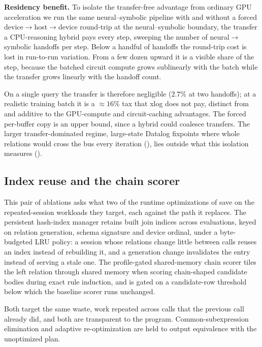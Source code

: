 \textbf{Residency benefit.} To isolate the transfer-free advantage from ordinary GPU acceleration we run the same neural--symbolic pipeline with and without a forced device$\to$host$\to$device round-trip at the neural--symbolic boundary, the transfer a CPU-reasoning hybrid pays every step, sweeping the number of neural$\to$symbolic handoffs per step. Below a handful of handoffs the round-trip cost is lost in run-to-run variation. From a few dozen upward it is a visible share of the step, because the batched circuit compute grows sublinearly with the batch while the transfer grows linearly with the handoff count.

On a single query the transfer is therefore negligible ($2.7\%$ at two handoffs); at a realistic training batch it is a ${\approx}16\%$ tax that xlog does not pay, distinct from and additive to the GPU-compute and circuit-caching advantages. The forced per-buffer copy is an upper bound, since a hybrid could coalesce transfers. The larger transfer-dominated regime, large-state Datalog fixpoints where whole relations would cross the bus every iteration (), lies outside what this isolation measures ().

\subsection{Index reuse and the chain scorer}\label{sec:runtime-eval}

This pair of ablations asks what two of the runtime optimizations of  save on the repeated-session workloads they target, each against the path it replaces. The persistent hash-index manager retains built join indices across evaluations, keyed on relation generation, schema signature and device ordinal, under a byte-budgeted LRU policy: a session whose relations change little between calls reuses an index instead of rebuilding it, and a generation change invalidates the entry instead of serving a stale one. The profile-gated shared-memory chain scorer tiles the left relation through shared memory when scoring chain-shaped candidate bodies during exact rule induction, and is gated on a candidate-row threshold below which the baseline scorer runs unchanged.

Both target the same waste, work repeated across calls that the previous call already did, and both are transparent to the program. Common-subexpression elimination and adaptive re-optimization are held to output equivalence with the unoptimized plan.

